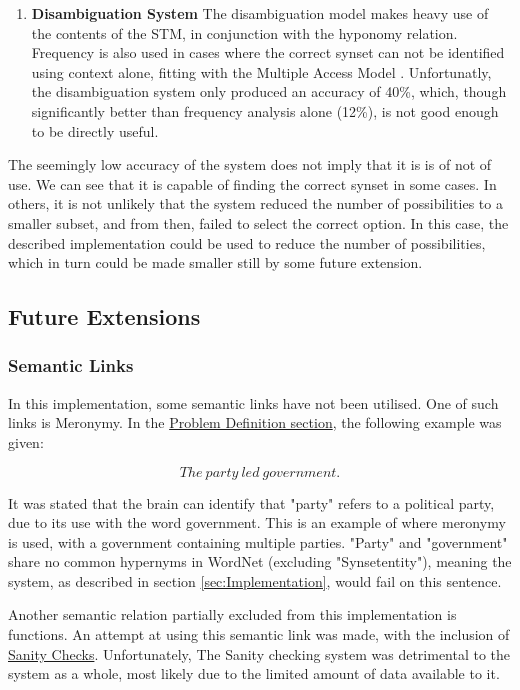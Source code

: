\documentclass[]{article}
\begin{document}
\begin{enumerate}
		
	
	\item \textbf{Disambiguation System} \newline
		The disambiguation model makes heavy use of the contents of the STM, in conjunction with the hyponomy relation. Frequency is also used in cases where the correct synset can not be identified using context alone, fitting with the Multiple Access Model \cite{PsychologyOfLanguage}. Unfortunatly, the disambiguation system only produced an accuracy of 40\%, which, though significantly better than frequency analysis alone (12\%), is not good enough to be directly useful. 
	

\end{enumerate}

The seemingly low accuracy of the system does not imply that it is is of not of use. We can see that it is capable of finding the correct synset in some cases. In others, it is not unlikely that the system reduced the number of possibilities to a smaller subset, and from then, failed to select the correct option. In this case, the described implementation could be used to reduce the number of possibilities, which in turn could be made smaller still by some future extension.


\subsection{Future Extensions}
\label{sec:ConcFuture}

\subsubsection{Semantic Links}
\label{sec:FutureSemantic}
In this implementation, some semantic links have not been utilised. One of such links is Meronymy. In the \hyperref[sec:ProbDef]{Problem Definition section}, the following example was given:

\[The\: party\: led\: government.\]

It was stated that the brain can identify that "party" refers to a political party, due to its use with the word government. This is an example of where meronymy is used, with a government containing multiple parties. "Party" and "government" share no common hypernyms in WordNet (excluding "Synset{entity}"), meaning the system, as described in section \ref{sec:Implementation}, would fail on this sentence. 

Another semantic relation partially excluded from this implementation is functions. An attempt at using this semantic link was made, with the inclusion of \hyperref[sec:Sanity]{Sanity Checks}. Unfortunately, The Sanity checking system was detrimental to the system as a whole, most likely due to the limited amount of data available to it.
\end{document}
